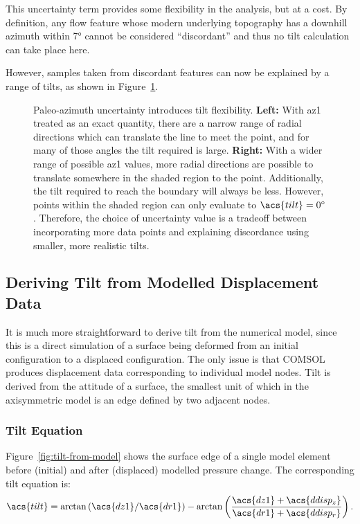 This uncertainty term provides some flexibility in the analysis, but at a cost. By definition, any flow feature whose modern underlying topography has a downhill azimuth within \ang{7} cannot be considered ``discordant'' and thus no tilt calculation can take place here.

However, samples taken from discordant features can now be explained by a range of tilts, as shown in Figure~\ref{fig:az1-uncertainty}.

\begin{figure}
    \caption[Paleo-azimuth uncertainty]{Paleo-azimuth uncertainty introduces tilt flexibility. \textbf{Left:} With \acs{az1} treated as an exact quantity, there are a narrow range of radial directions which can translate the line to meet the point, and for many of those angles the tilt required is large. \textbf{Right:} With a wider range of possible \acs{az1} values, more radial directions are possible to translate somewhere in the shaded region to the point. Additionally, the tilt required to reach the boundary will always be less. However, points within the shaded region can only evaluate to $\acs{tilt}=\ang{0}$. Therefore, the choice of uncertainty value is a tradeoff between incorporating more data points and explaining discordance using smaller, more realistic tilts.}%
    \label{fig:az1-uncertainty}
\end{figure}

\subsection{Deriving Tilt from Modelled Displacement Data}

It is much more straightforward to derive tilt from the numerical model, since this is a direct simulation of a surface being deformed from an initial configuration to a displaced configuration. The only issue is that COMSOL produces displacement data corresponding to individual model nodes. Tilt is derived from the attitude of a surface, the smallest unit of which in the axisymmetric model is an edge defined by two adjacent nodes.

\subsubsection{Tilt Equation}
Figure~\ref{fig:tilt-from-model} shows the surface edge of a single model element before (initial) and after (displaced) modelled pressure change. The corresponding tilt equation is:
\begin{equation}
    \acs{tilt} = \arctan\left({\acs{dz1}}/{\acs{dr1}}\right) - \arctan\left(\dfrac{\acs{dz1}+\acs{ddisp_z}}{\acs{dr1}+\acs{ddisp_r}}\right).\label{eq:tilt-from-model}
\end{equation}

